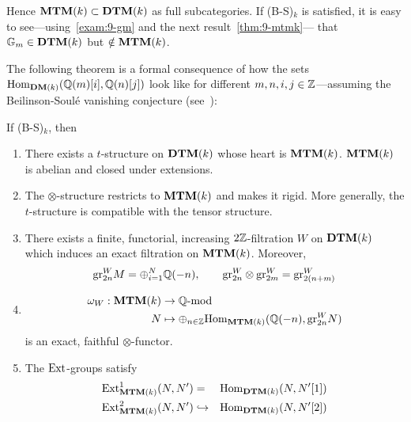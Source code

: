 \begin{exam}
  Hence $\mathbf{MTM}(k) \subset \mathbf{DTM}(k)$ as full subcategories. If
  (B-S)$_{k}$ is satisfied, it is easy to see---using~\ref{exam:9-gm}
  and the next result~\ref{thm:9-mtmk}---
  that $\mathbb{G}_m\in \mathbf{DTM}(k)$ but $\notin\mathbf{MTM}(k)$.%
\end{exam}

The following theorem is a formal consequence of how the sets
$\mathrm{Hom}_{\mathbf{DM}(k)}(\mathbb{Q}(m)[i],\mathbb{Q}(n)[j])$ look like for different
$m,n,i,j\in\mathbb{Z}$---assuming the Beilinson-Soulé vanishing conjecture
(see~\cite{levine92-tatemotives}):
\begin{thm}\label{thm:9-mtmk}
  If (B-S)$_k$, then
  \begin{enumerate}
  \item\label{thm:9-abelian} There exists a $t$-structure on $\mathbf{DTM}(k)$ whose heart is
    $\mathbf{MTM}(k)$. $\mathbf{MTM}(k)$ is abelian and closed under extensions.
  \item\label{thm:9-tensor} The $\otimes$-structure restricts to $\mathbf{MTM}(k)$ and makes it
    rigid. More generally, the $t$-structure is compatible with the
    tensor structure.
  \item There exists a finite, functorial, increasing $2\mathbb{Z}$-filtration
    $W$ on $\mathbf{DTM}(k)$ which induces an exact filtration on
    $\mathbf{MTM}(k)$. Moreover,
    \begin{equation*}
      \mathrm{gr}_{2n}^W M = \oplus_{i=1}^N \mathbb{Q}(-n), \qquad \mathrm{gr}_{2n}^W \otimes \mathrm{gr}_{2m}^W = \mathrm{gr}_{2(n+m)}^W
    \end{equation*}
  \item\label{thm:9-fiber} \begin{align*}
      \omega_W:\mathbf{MTM}(k)&\to\mathbb{Q}\text{-}\mathrm{mod}\\
      N &\mapsto \oplus_{n \in \mathbb{Z}}\mathrm{Hom}_{\mathbf{MTM}(k)}(\mathbb{Q}(-n), \mathrm{gr}_{2n}^WN)
      \end{align*}
      is an exact, faithful $\otimes$-functor.
  \item\label{thm:9-ext} The $\mathrm{Ext}$-groups satisfy
    \begin{eqnarray*}
      \mathrm{Ext}^1_{\mathbf{MTM}(k)}(N,N') & = & \mathrm{Hom}_{\mathbf{DTM}(k)}(N,N'[1]) \\
      \mathrm{Ext}^2_{\mathbf{MTM}(k)}(N,N') & \hookrightarrow & \mathrm{Hom}_{\mathbf{DTM}(k)}(N,N'[2])
    \end{eqnarray*}
  \end{enumerate}
\end{thm}

